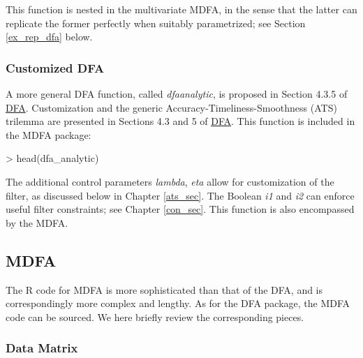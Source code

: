 \documentclass[a4paper]{book}
\begin{document}
This function is nested in the multivariate MDFA,
  in the sense that the latter can replicate the former perfectly when suitably parametrized;
 see Section \ref{ex_rep_dfa} below.



\subsubsection{Customized DFA}

A more general DFA function, called \emph{dfa\textunderscore analytic}, is proposed in Section 4.3.5 of
\href{http://blog.zhaw.ch/sef/files/2014/10/DFA.pdf}{DFA}. Customization and the generic 
 Accuracy-Timeliness-Smoothness (ATS) trilemma are presented in Sections 4.3 and 5 of
 \href{http://blog.zhaw.ch/sef/files/2014/10/DFA.pdf}{DFA}. This function is included in the MDFA package: 
\begin{Schunk}
\begin{Sinput}
> head(dfa_analytic)
\end{Sinput}
\begin{Soutput}
1 function (L, lambda, periodogram, Lag, Gamma, eta, cutoff, i1, 
2     i2)                                                        
3 {                                                              
4     periodogram[1] <- periodogram[1]/2                         
5     lambda <- abs(lambda)                                      
6     eta <- abs(eta)                                            
\end{Soutput}
\end{Schunk}
The additional control parameters {\em lambda}, {\em eta} allow for customization of the filter,  as discussed below
 in Chapter \ref{ats_sec}.  The Boolean {\em i1} and {\em i2}
  can enforce useful filter constraints; see Chapter \ref{con_sec}. This function is also encompassed by the   MDFA. 



\subsection{MDFA}\label{mdfa_intro}

The R code for MDFA is more sophisticated than that of the DFA, and is correspondingly more complex and lengthy. 
 As for the DFA package, the MDFA code can be sourced. We here briefly review the corresponding pieces.


\subsubsection{Data Matrix}
\end{document}
